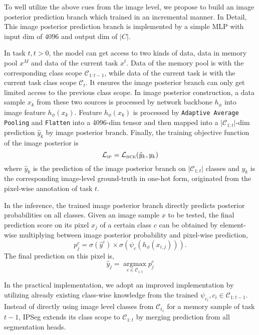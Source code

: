 To well utilize the above cues from the image level, we propose to build an image posterior prediction branch which trained in an incremental manner. In Detail, This image posterior prediction branch is implemented by a simple MLP with input dim of $4096$ and output dim of $\left|C\right|$. 

In task $t, t > 0$, the model can get access to two kinds of data, data in memory pool $x^M$ and data of the current task $x^t$. Data of the memory pool is with the corresponding class scope $\mathcal{C}_{1:t-1}$, while data of the current task is with the current task class scope $\mathcal{C}_{t}$. It ensures the image posterior branch can only get limited access to the previous class scope. In image posterior construction, a data sample $x_k$ from these two sources is processed by network backbone $h_{\phi}$ into image feature $h_{\phi}(x_k)$. Feature $h_{\phi}(x_k)$ is processed by \texttt{Adaptive Average Pooling} and \texttt{Flatten} into a 4096-dim tensor and then mapped into a $\left|\mathcal{C}_{1:t}\right|$-dim prediction $\hat{y}_k$ by image posterior branch. Finally, the training objective function of the image posterior is 
\begin{equation}
    \mathcal{L}_{\text{\tiny IP}} = \mathcal{L}_{\text{\tiny BCE}}(\hat{y}_k, y_k) 
\end{equation}
where $\hat{y}_k$ is the prediction of the image posterior branch on $\left|\mathcal{C}_{1:t}\right|$ classes and $y_k$ is the corresponding image-level ground-truth in one-hot form, originated from the pixel-wise annotation of task $t$.

In the inference, the trained image posterior branch directly predicts posterior probabilities on all classes. Given an image sample $x$ to be tested, the final prediction score on its pixel $x_{j}$ of a certain class $c$ can be obtained by element-wise multiplying between image posterior probability and pixel-wise prediction, 
\begin{equation}
    p_{j}^{c} = \sigma(\hat{y}^c) \times \sigma(\psi_{c}(h_\phi(x_{i,j}))).
\end{equation}
The final prediction on this pixel is,
\begin{equation}
    \hat{y}_{j} = \mathop{\arg\max}\limits_{c\in\mathcal{C}_{1:t}} p_{j}^c
\end{equation}

In the practical implementation, we adopt an improved implementation by utilizing already existing class-wise knowledge from the trained $\psi_{c_i}, c_i \in \mathcal{C}_{1:t-1}$. Instead of directly using image level classes from $\mathcal{C}_{t_1}$ for a memory sample of task $t-1$, IPSeg extends its class scope to  $\mathcal{C}_{1:t}$ by merging prediction from all segmentation heads.


